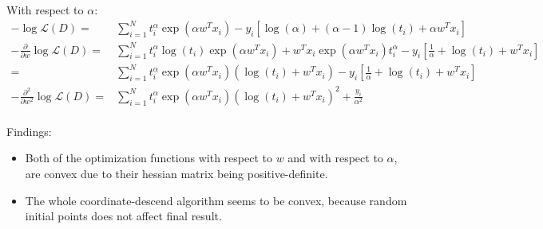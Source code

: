 \documentclass[]{article}
\begin{document}
With respect to $\alpha$:
\begin{equation*}
\begin{split}
-\log\mathcal{L}(D)
=&\sum_{i=1}^{N}t_i^\alpha\exp(\alpha w^Tx_i)-y_i\left[\log(\alpha)+(\alpha-1)\log(t_i)+\alpha w^Tx_i\right]\\
-\frac{\partial}{\partial w}\log\mathcal{L}(D)=&\sum_{i=1}^{N}t_i^\alpha\log(t_i)\exp(\alpha w^Tx_i)+w^Tx_i\exp(\alpha w^Tx_i)t_i^\alpha-y_i\left[\frac{1}{\alpha}+\log(t_i)+w^Tx_i\right]\\
=&\sum_{i=1}^{N}t_i^\alpha\exp(\alpha w^Tx_i)(\log(t_i)+w^Tx_i)-y_i\left[\frac{1}{\alpha}+\log(t_i)+w^Tx_i\right]\\
-\frac{\partial^2}{\partial w^2}\log\mathcal{L}(D)=&\sum_{i=1}^{N}t_i^\alpha\exp(\alpha w^Tx_i)(\log(t_i)+w^Tx_i)^2+\frac{y_i}{\alpha^2}\\
\end{split}
\end{equation*}

Findings:
\begin{itemize}
\item Both of the optimization functions with respect to $w$ and with respect to $\alpha$, are convex due to their hessian matrix being positive-definite.
\item The whole coordinate-descend algorithm seems to be convex, because random initial points does not affect final result.
\end{itemize}
\end{document}
